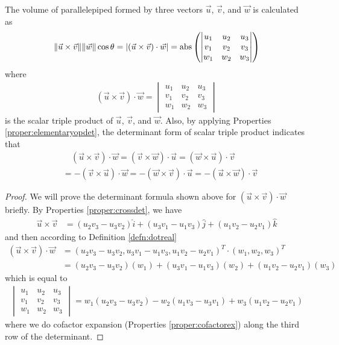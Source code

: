 \begin{proper}
\label{proper:parallelpiped}
The volume of parallelepiped formed by three vectors $\vec{u}$, $\vec{v}$, and $\vec{w}$ is calculated as
\begin{align*}
\norm{\vec{u} \times \vec{v}} \norm{\vec{w}} \cos\theta = |(\vec{u} \times \vec{v}) \cdot \vec{w}| =
\text{abs}\left(
\begin{vmatrix}
u_1 & u_2 & u_3 \\
v_1 & v_2 & v_3 \\
w_1 & w_2 & w_3
\end{vmatrix}\right)
\end{align*}
where
\begin{align*}
(\vec{u} \times \vec{v}) \cdot \vec{w} =
\begin{vmatrix}
u_1 & u_2 & u_3 \\
v_1 & v_2 & v_3 \\
w_1 & w_2 & w_3
\end{vmatrix}    
\end{align*}
is the scalar triple product of $\vec{u}$, $\vec{v}$, and $\vec{w}$. Also, by applying Properties \ref{proper:elementaryopdet}, the determinant form of scalar triple product indicates that
\begin{align*}
&\quad (\vec{u} \times \vec{v}) \cdot \vec{w} = (\vec{v} \times \vec{w}) \cdot \vec{u} = (\vec{w} \times \vec{u}) \cdot \vec{v} \\
&= -(\vec{v} \times \vec{u}) \cdot \vec{w} = -(\vec{w} \times \vec{v}) \cdot \vec{u} = -(\vec{u} \times \vec{w}) \cdot \vec{v}
\end{align*}
\end{proper}
\begin{proof}
We will prove the determinant formula shown above for $(\vec{u} \times \vec{v}) \cdot \vec{w}$ briefly. By Properties \ref{proper:crossdet}, we have
\begin{align*}
\vec{u} \times \vec{v} &= (u_2v_3 - u_3v_2)\hat{i} + (u_3v_1 - u_1v_3)\hat{j} + (u_1v_2 - u_2v_1)\hat{k}     
\end{align*}
and then according to Definition \ref{defn:dotreal}
\begin{align*}
(\vec{u} \times \vec{v}) \cdot \vec{w} &= (u_2v_3 - u_3v_2, u_3v_1 - u_1v_3, u_1v_2 - u_2v_1)^T \cdot (w_1, w_2, w_3)^T \\ 
&= (u_2v_3 - u_3v_2)(w_1) + (u_3v_1 - u_1v_3)(w_2) + (u_1v_2 - u_2v_1)(w_3) 
\end{align*}
which is equal to
\begin{align*}
\begin{vmatrix}
u_1 & u_2 & u_3 \\
v_1 & v_2 & v_3 \\
w_1 & w_2 & w_3
\end{vmatrix}
= w_1(u_2v_3 - u_3v_2) - w_2(u_1v_3 - u_3v_1) + w_3(u_1v_2 - u_2v_1) 
\end{align*}
where we do cofactor expansion (Properties \ref{proper:cofactorex}) along the third row of the determinant.
\end{proof}
